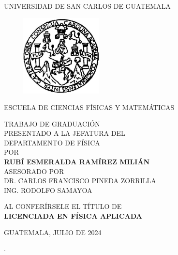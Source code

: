 \begin{center}
UNIVERSIDAD DE SAN CARLOS DE GUATEMALA
\end{center}

\begin{figure}[h]
  \begin{center}
    \includegraphics[width=4.15cm]{../Images/escudo-eps-converted-to.jpg}\\
  \end{center}
\end{figure}

\begin{center}
\vspace{-0.5mm}ESCUELA DE CIENCIAS FÍSICAS Y MATEMÁTICAS

\vfill

\vfill

TRABAJO DE GRADUACIÓN \\[3pt] PRESENTADO A LA JEFATURA DEL \\[3pt]
DEPARTAMENTO DE FÍSICA\\[3pt] POR \\[1.15cm]
\textbf{\MakeUppercase{Rubí Esmeralda Ramírez Milián}} \\[6pt]
ASESORADO POR\\ {\MakeUppercase{Dr\@. Carlos Francisco Pineda Zorrilla  }}\\
{\MakeUppercase{ Ing\@. Rodolfo Samayoa}}  

\vfill
AL CONFERÍRSELE EL TÍTULO DE \\[6pt]
\textbf{LICENCIADA EN FÍSICA APLICADA}

\vfill

GUATEMALA, {\MakeUppercase{ julio de 2024}}

\end{center}


\newpage
\textcolor[rgb]{1,1,1}{.} 

\thispagestyle{empty}


\newpage

